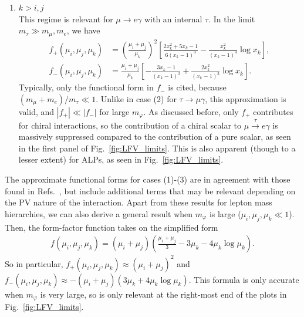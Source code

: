 {\begin{enumerate}
    \item $k > i, j$\\
    This regime is relevant for $\mu \rightarrow e\gamma$ with an internal $\tau$. In the limit $m_\tau \gg m_\mu, m_e$, we have
    \begin{align}
    f_+(\mu_i, \mu_j, \mu_k) &= \left(\frac{\mu_i + \mu_j}{\mu_k}\right)^2\left[\frac{2x_k^2 + 5x_k - 1}{6(x_k - 1)^3}-\frac{x_k^2}{(x_k-1)^4}\log{x_k}\right], \nonumber\\
f_-(\mu_i, \mu_j, \mu_k) &= \frac{\mu_i + \mu_j}{\mu_k}\left[-\frac{3x_k - 1}{(x_k - 1)^2} + \frac{2x_k^2}{(x_k-1)^3}\log{x_k}\right].
    \end{align}
    Typically, only the functional form in $f_-$ is cited, because $(m_\mu + m_e)/m_\tau \ll 1$. Unlike in case (2) for $\tau\rightarrow\mu\gamma$, this approximation is valid, and $|f_+| \ll |f_-|$ for large $m_\varphi$. As discussed before, only $f_+$ contributes for chiral interactions, so the contribution of a chiral scalar to $\mu\stackrel{\tau}{\longrightarrow}e\gamma$ is massively suppressed compared to the contribution of a pure scalar, as seen in the first panel of Fig.~\ref{fig:LFV_limits}. This is also apparent (though to a lesser extent) for ALPs, as seen in Fig.~\ref{fig:LFV_limits}.
\end{enumerate}
The approximate functional forms for cases (1)-(3) are in agreement with those found in Refs.~\cite{Escribano:2020wua,Cornella:2019uxs,Bauer:2021mvw}, but include additional terms that may be relevant depending on the PV nature of the interaction. Apart from these results for lepton mass hierarchies, we can also derive a general result when $m_\varphi$ is large ($\mu_i, \mu_j, \mu_k \ll 1$). Then, the form-factor function takes on the simplified form
\begin{align}
    f(\mu_i, \mu_j, \mu_k) = (\mu_i+\mu_j)\left(\frac{\mu_i+\mu_j}{3} - 3\mu_k - 4\mu_k \log{\mu_k}\right).
\end{align}
So in particular, $f_+(\mu_i, \mu_j, \mu_k) \approx (\mu_i+\mu_j)^2$ and $f_-(\mu_i, \mu_j, \mu_k) \approx -(\mu_i+\mu_j)(3\mu_k+4\mu_k\log{\mu_k})$. This formula is only accurate when $m_\varphi$ is very large, so is only relevant at the right-most end of the plots in Fig.~\ref{fig:LFV_limits}.

}

